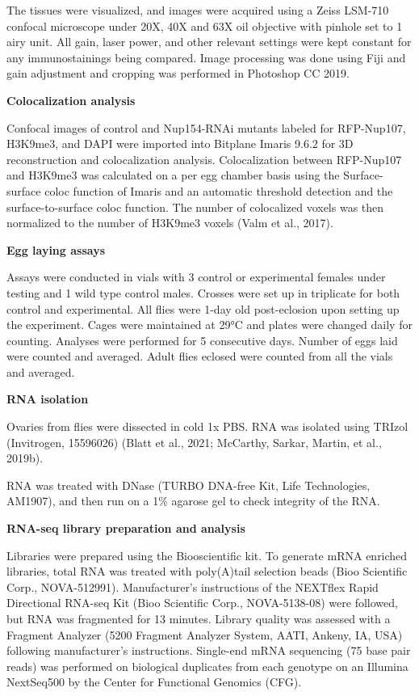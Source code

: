 \documentclass[12pt,oneside]{reedthesis}
\begin{document}
The tissues were visualized, and images were acquired using a Zeiss
LSM-710 confocal microscope under 20X, 40X and 63X oil objective with
pinhole set to 1 airy unit. All gain, laser power, and other relevant
settings were kept constant for any immunostainings being compared.
Image processing was done using Fiji and gain adjustment and cropping
was performed in Photoshop CC 2019.

\textbf{Colocalization analysis}

Confocal images of control and Nup154-RNAi mutants labeled for
RFP-Nup107, H3K9me3, and DAPI were imported into Bitplane Imaris 9.6.2
for 3D reconstruction and colocalization analysis. Colocalization
between RFP-Nup107 and H3K9me3 was calculated on a per egg chamber basis
using the Surface-surface coloc function of Imaris and an automatic
threshold detection and the surface-to-surface coloc function. The
number of colocalized voxels was then normalized to the number of
H3K9me3 voxels (Valm et al., 2017).

\textbf{Egg laying assays}

Assays were conducted in vials with 3 control or experimental females
under testing and 1 wild type control males. Crosses were set up in
triplicate for both control and experimental. All flies were 1-day old
post-eclosion upon setting up the experiment. Cages were maintained at
29°C and plates were changed daily for counting. Analyses were performed
for 5 consecutive days. Number of eggs laid were counted and averaged.
Adult flies eclosed were counted from all the vials and averaged.

\textbf{RNA isolation}

Ovaries from flies were dissected in cold 1x PBS. RNA was isolated using
TRIzol (Invitrogen, 15596026) (Blatt et al., 2021; McCarthy, Sarkar, Martin, et al., 2019b).

RNA was treated with DNase (TURBO DNA-free Kit, Life Technologies,
AM1907), and then run on a 1\% agarose gel to check integrity of the RNA.

\textbf{RNA-seq library preparation and analysis}

Libraries were prepared using the Biooscientific kit. To generate mRNA
enriched libraries, total RNA was treated with poly(A)tail selection
beads (Bioo Scientific Corp., NOVA-512991). Manufacturer's instructions
of the NEXTflex Rapid Directional RNA-seq Kit (Bioo Scientific Corp.,
NOVA-5138-08) were followed, but RNA was fragmented for 13 minutes.
Library quality was assessed with a Fragment Analyzer (5200 Fragment
Analyzer System, AATI, Ankeny, IA, USA) following manufacturer's
instructions. Single-end mRNA sequencing (75 base pair reads) was
performed on biological duplicates from each genotype on an Illumina
NextSeq500 by the Center for Functional Genomics (CFG).
\end{document}
